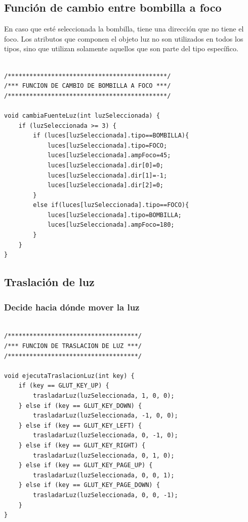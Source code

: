 \documentclass[12pt,a4paper]{article}
\begin{document}
\subsection{Función de cambio entre bombilla a foco}

En caso que esté seleccionada la bombilla, tiene una dirección que no tiene el foco. Los atributos que componen el objeto luz no son utilizados en todos los tipos, sino que utilizan solamente aquellos que son parte del tipo específico.

\begin{lstlisting}

/********************************************/
/*** FUNCION DE CAMBIO DE BOMBILLA A FOCO ***/
/********************************************/

void cambiaFuenteLuz(int luzSeleccionada) {
    if (luzSeleccionada >= 3) {
        if (luces[luzSeleccionada].tipo==BOMBILLA){
            luces[luzSeleccionada].tipo=FOCO;
            luces[luzSeleccionada].ampFoco=45;
            luces[luzSeleccionada].dir[0]=0;
            luces[luzSeleccionada].dir[1]=-1;
            luces[luzSeleccionada].dir[2]=0;
        }
        else if(luces[luzSeleccionada].tipo==FOCO){
            luces[luzSeleccionada].tipo=BOMBILLA;
            luces[luzSeleccionada].ampFoco=180;
        }
    }
}
\end{lstlisting}

\subsection{Traslación de luz}

\subsubsection{Decide hacia dónde mover la luz}
\begin{lstlisting}

/************************************/
/*** FUNCION DE TRASLACION DE LUZ ***/
/************************************/

void ejecutaTraslacionLuz(int key) {
    if (key == GLUT_KEY_UP) {
        trasladarLuz(luzSeleccionada, 1, 0, 0);
    } else if (key == GLUT_KEY_DOWN) {
        trasladarLuz(luzSeleccionada, -1, 0, 0);
    } else if (key == GLUT_KEY_LEFT) {
        trasladarLuz(luzSeleccionada, 0, -1, 0);
    } else if (key == GLUT_KEY_RIGHT) {
        trasladarLuz(luzSeleccionada, 0, 1, 0);
    } else if (key == GLUT_KEY_PAGE_UP) {
        trasladarLuz(luzSeleccionada, 0, 0, 1);
    } else if (key == GLUT_KEY_PAGE_DOWN) {
        trasladarLuz(luzSeleccionada, 0, 0, -1);
    }
}

\end{lstlisting}
\end{document}
